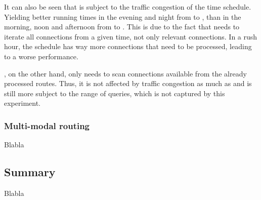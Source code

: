	 It can also be seen that \csa is subject to the traffic congestion of the time schedule. Yielding better running times in the evening and night
	 from  to , than in the morning, noon and afternoon from  to .
	 This is due to the fact that \csa needs to iterate all connections from a given time, not only relevant connections. In a rush hour, the schedule
	 has way more connections that need to be processed, leading to a worse performance.
	 
	 \dijkstra, on the other hand, only needs to scan connections available from the already processed routes. Thus, it is not affected by traffic
	 congestion as much as \csa and is still more subject to the range of queries, which is not captured by this experiment.

\subsubsection{Multi-modal routing}
	Blabla

\subsection{Summary}
	Blabla
